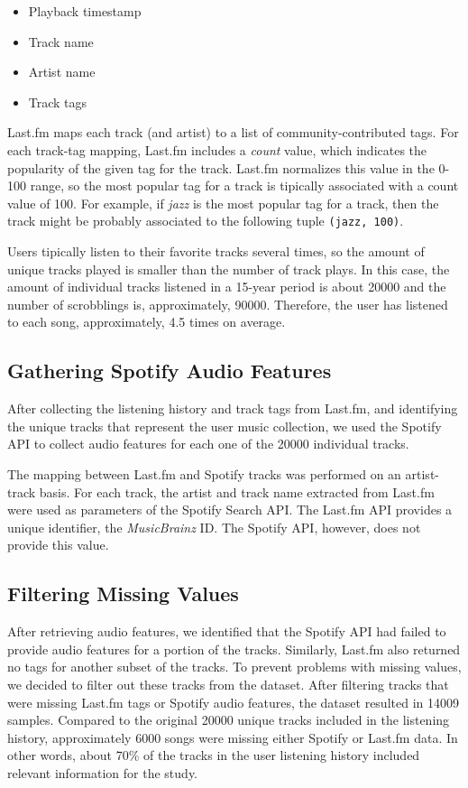 \documentclass[sn-mathphys]{sn-jnl}%
\theoremstyle{thmstyleone}%
\theoremstyle{thmstyletwo}%
\theoremstyle{thmstylethree}%
\begin{document}
\begin{itemize}
\item Playback timestamp
\item Track name
\item Artist name
\item Track tags
\end{itemize}

Last.fm maps each track (and artist) to a list of community-contributed tags.
For each track-tag mapping, Last.fm includes
a \emph{count} value, which indicates the popularity of the given tag for the track.
Last.fm normalizes this value in the 0-100 range, so the most popular tag for a track is tipically associated with a
count value of 100.
For example, if \emph{jazz} is the most popular tag for a track,
then the track might be probably associated to the following tuple \verb|(jazz, 100)|.

Users tipically listen to their favorite tracks several times,
so the amount of unique tracks played is smaller
than the number of track plays. In this case, the amount of
individual tracks listened in a 15-year period is about \num{20000} and the number of scrobblings is, approximately, \num{90000}.
Therefore, the user has listened to each song, approximately, \num{4.5} times on average.


\subsection{Gathering Spotify Audio Features}

After collecting the listening history and track tags from Last.fm, and identifying the unique
tracks that represent the user music collection, we used the Spotify API to
collect audio features for each one of the \num{20000} individual tracks.


The mapping between Last.fm and Spotify tracks was performed on an artist-track basis.
For each track, the artist and track name extracted from Last.fm were used as parameters of the Spotify Search API.
The Last.fm API provides a unique identifier, the \emph{MusicBrainz} ID.
The Spotify API, however, does not provide this value.

\subsection{Filtering Missing Values}

After retrieving audio features, we identified that the Spotify API had failed to provide audio features for a portion of the tracks.
Similarly, Last.fm also returned no tags for another subset of the tracks.
To prevent problems with missing values, we decided to filter out these tracks from the dataset.
After filtering tracks that were missing Last.fm tags or Spotify audio features,
the dataset resulted in \num{14009} samples.
Compared to the original \num{20000} unique tracks included in the listening history, approximately \num{6000} songs were missing either Spotify or Last.fm data.
In other words, about 70\% of the tracks in the user listening history included relevant information for the study.
\end{document}
